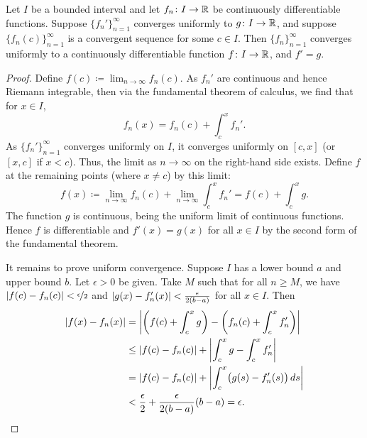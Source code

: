 \begin{thm} \label{thm:dersconverge}
Let $I$ be a bounded interval and let
$f_n \colon I \to {\mathbb{R}}$ be continuously differentiable functions.
Suppose $\{ f_n' \}_{n=1}^\infty$ converges uniformly to $g \colon I \to {\mathbb{R}}$,
and suppose $\bigl\{ f_n(c) \bigr\}_{n=1}^\infty$ is a
convergent sequence for some $c \in I$.  Then $\{ f_n \}_{n=1}^\infty$ converges uniformly to 
a continuously differentiable function $f \colon I \to {\mathbb{R}}$, and $f' = g$.
\end{thm}

\begin{proof}
Define $f(c) \coloneqq \lim_{n\to \infty} f_n(c)$.
As $f_n'$ are continuous and hence Riemann integrable,
then
via the fundamental theorem of calculus, we find that for $x \in I$,
\begin{equation*}
f_n(x) = f_n(c) + \int_c^x f_n' .
\end{equation*}
As $\{ f_n' \}_{n=1}^\infty$ converges uniformly on $I$, it converges uniformly
on $[c,x]$ (or $[x,c]$ if $x < c$).
Thus, the limit as $n \to \infty$ on the right-hand side exists.
Define $f$ at the remaining points (where $x\neq c$) by this limit:
\begin{equation*}
f(x) \coloneqq
\lim_{n\to\infty} f_n(c) + \lim_{n\to\infty} \int_c^x f_n'
=
f(c) + \int_c^x g .
\end{equation*}
The function $g$ is continuous, being the uniform limit of continuous
functions.  Hence $f$ is differentiable and $f'(x) = g(x)$ for all $x \in I$
by the second form of the fundamental theorem.

It remains to prove
uniform convergence.
Suppose $I$ has a lower bound $a$ and upper bound $b$.
Let $\epsilon > 0$ be given.  Take $M$
such that for all $n \geq M$, we have
$\left\lvert {f(c)-f_n(c)} \right\rvert < \nicefrac{\epsilon}{2}$
and
$\left\lvert {g(x)-f_n'(x)} \right\rvert < \frac{\epsilon}{2(b-a)}$
for all $x \in I$.  Then
\begin{equation*}
\begin{split}
\left\lvert {f(x) - f_n(x)} \right\rvert & =
\left\lvert {\left(f(c) + \int_c^x g\right) - \left( f_n(c) + \int_c^x f_n' \right)} \right\rvert
\\
& \leq
\left\lvert {f(c) - f_n(c)} \right\rvert + \left\lvert {\int_c^x g - \int_c^x f_n'} \right\rvert
\\
& =
\left\lvert {f(c) - f_n(c)} \right\rvert + \left\lvert {\int_c^x \bigl(g(s) - f_n'(s)\bigr) \, ds} \right\rvert
\\
& <
\frac{\epsilon}{2}
+
\frac{\epsilon}{2(b-a)}
(b-a)
=\epsilon. \qedhere
\end{split}
\end{equation*}
\end{proof}

